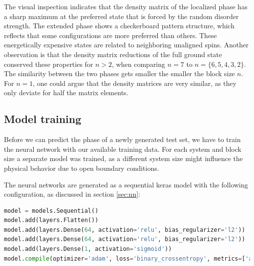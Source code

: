 \documentclass[reprint,amsmath,amssymb,aps,prb]{revtex4-2}
\begin{document}
\twocolumngrid\newpage
The visual inspection indicates that the density matrix of the localized phase has a sharp maximum at the preferred state that is forced by the random disorder strength. The extended phase shows a checkerboard pattern structure, which reflects that some configurations are more preferred than others. These energetically expensive states are related to neighboring unaligned spins. Another observation is that the density matrix reductions of the full ground state conserved these properties for $n>2$, when comparing $n=7$ to $n=\{6,5,4,3,2\}$. The similarity between the two phases gets smaller the smaller the block size $n$. For $n=1$, one could argue that the density matrices are very similar, as they only deviate for half the matrix elements.



\subsection{Model training}\label{sec:loss_acc}

Before we can predict the phase of a newly generated test set, we have to train the neural network with our available training data. For each system and block size a separate model was trained, as a different system size might influence the physical behavior due to open boundary conditions.

The neural networks are generated as a sequential keras model with the following configuration, as discussed in section \ref{sec:nn}: 

\begin{lstlisting}[language=Python]
model = models.Sequential()
model.add(layers.Flatten())
model.add(layers.Dense(64, activation='relu', bias_regularizer='l2'))
model.add(layers.Dense(64, activation='relu', bias_regularizer='l2'))
model.add(layers.Dense(1, activation='sigmoid'))
model.compile(optimizer='adam', loss='binary_crossentropy', metrics=['accuracy'])
\end{lstlisting}%
\end{document}
